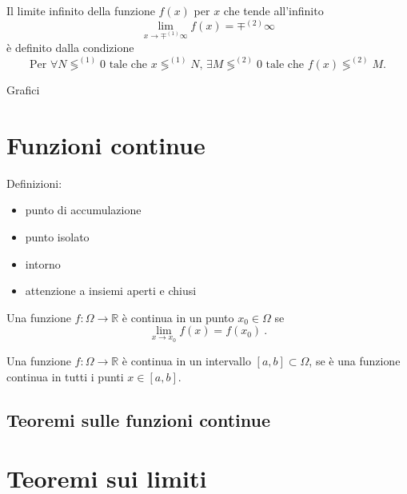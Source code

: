 \begin{definition} Il limite infinito della funzione $f(x)$ per $x$ che tende all'infinito
    \begin{equation}
        \lim_{x \rightarrow \mp^{(1)} \infty} f(x) = \mp^{(2)} \infty
    \end{equation}
    è definito dalla condizione
    \begin{equation}
        \text{Per $\forall N \lessgtr^{(1)} 0$ tale che $x \lessgtr^{(1)} N$, $\exists M \lessgtr^{(2)} 0$ tale che $f(x) \lessgtr^{(2)} M$.}
    \end{equation}
\end{definition}

{\color{red}Grafici}

\section{Funzioni continue}
{\color{red}
Definizioni:
\begin{itemize}
    \item punto di accumulazione
    \item punto isolato
    \item intorno
    \item attenzione a insiemi aperti e chiusi
\end{itemize}
}
\begin{definition} Una funzione $f: \Omega \rightarrow \mathbb{R}$ è continua in un punto $x_0 \in \Omega$ se 
    \begin{equation}
        \lim_{x \rightarrow x_0}f(x) = f(x_0) \ .
    \end{equation}
\end{definition}
\begin{definition} Una funzione $f: \Omega \rightarrow \mathbb{R}$ è continua in un intervallo $[a, b] \subset \Omega$, se è una funzione continua in tutti i punti $x \in [a, b]$.
\end{definition}

\subsection{Teoremi sulle funzioni continue}

\section{Teoremi sui limiti}

